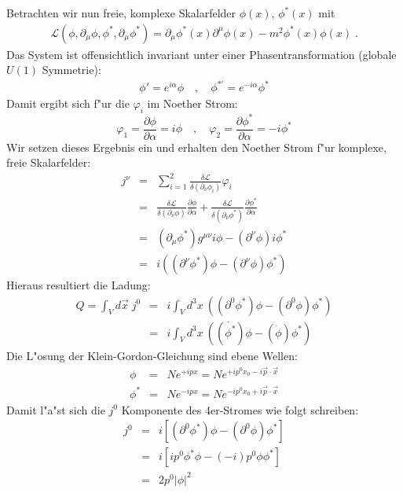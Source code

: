 \documentclass[11pt,a4paper]{article}
\begin{document}
Betrachten wir nun freie, komplexe Skalarfelder $\phi(x)$, $\phi^*(x)$ mit
\begin{eqnarray}
\mathcal{L}(\phi,\partial_\mu\phi,\phi^*,\partial_\mu\phi^*) = \partial_\mu\phi^*(x)\partial^\mu\phi(x) - m^2\phi^*(x)\phi(x) \;.
\end{eqnarray}
Das System ist offensichtlich invariant unter einer Phasentransformation (globale $U(1)$ Symmetrie):
\begin{eqnarray}
\phi' = e^{i\alpha}\phi \quad,\quad \phi^{*\prime} = e^{-i\alpha}\phi^*
\end{eqnarray}
Damit ergibt sich f"ur die $\varphi_i$ im Noether Strom:
\[\varphi_1 = \frac{\partial\phi}{\partial\alpha}= i\phi \quad,\quad \varphi_2 = \frac{\partial\phi^*}{\partial\alpha}= -i\phi^* \]
Wir setzen dieses Ergebnis ein und erhalten den Noether Strom f"ur komplexe, freie Skalarfelder:
\begin{eqnarray}
j^\nu & = & \sum_{i=1}^2 \frac{\delta\mathcal{L}}{\delta(\partial_\nu\phi_i)}\varphi_i\nonumber\\ & = & \frac{\delta\mathcal{L}}{\delta(\partial_\nu\phi)}\frac{\partial\phi}{\partial\alpha} + \frac{\delta\mathcal{L}}{\delta(\partial_\nu\phi^*)}\frac{\partial\phi^*}{\partial\alpha}\nonumber\\ & = & (\partial_\mu\phi^*)g^{\mu\nu}i\phi - (\partial^\nu\phi)i\phi^* \nonumber\\ & = & i\left((\partial^\nu\phi^*)\phi - (\partial^\nu\phi)\phi^*\right)
\end{eqnarray}
Hieraus resultiert die Ladung:
\begin{eqnarray}
Q = \int_V d\vec{x} \; j^0 & = & i \int_V d^3x \: \left((\partial^0\phi^*)\phi - (\partial^0\phi)\phi^*\right)\nonumber\\ & = & i \int_V d^3x\: \left((\dot{\phi^*})\phi - (\dot{\phi})\phi^*\right)
\end{eqnarray}
Die L"osung der Klein-Gordon-Gleichung sind ebene Wellen:
\begin{eqnarray*}
\phi & = & Ne^{+ipx} = Ne^{+ip^0x_0 - i\vec{p}\cdot\vec{x}}\\
\phi^* & = & Ne^{-ipx} = Ne^{-ip^0x_0 + i\vec{p}\cdot\vec{x}}
\end{eqnarray*}
Damit l"a"st sich die $j^0$ Komponente des 4er-Stromes wie folgt schreiben:
\begin{eqnarray}
j^0 & = & i [(\partial^0\phi^*)\phi - (\partial^0\phi)\phi^*]\nonumber\\ & = & i [ip^0\phi^*\phi - (-i)p^0\phi\phi^*]\nonumber\\ & = & 2p^0 |\phi|^2
\end{eqnarray}
\end{document}
